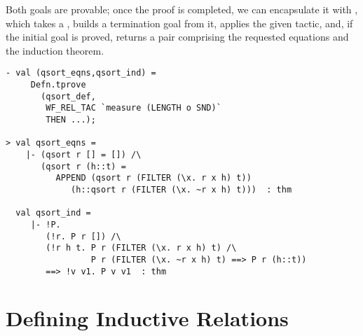 Both goals are provable; once the proof is completed, we can
encapsulate it with , which takes a , builds
a termination goal from it, applies the given tactic, and, if the
initial goal is proved, returns a pair comprising the requested
equations and the induction theorem.

\begin{session}
\begin{verbatim}
- val (qsort_eqns,qsort_ind) =
     Defn.tprove
       (qsort_def,
        WF_REL_TAC `measure (LENGTH o SND)`
        THEN ...);

> val qsort_eqns =
    |- (qsort r [] = []) /\
       (qsort r (h::t) =
          APPEND (qsort r (FILTER (\x. r x h) t))
             (h::qsort r (FILTER (\x. ~r x h) t)))  : thm

  val qsort_ind =
     |- !P.
        (!r. P r []) /\
        (!r h t. P r (FILTER (\x. r x h) t) /\
                 P r (FILTER (\x. ~r x h) t) ==> P r (h::t))
        ==> !v v1. P v v1  : thm
\end{verbatim}
\end{session}

\section{Defining Inductive Relations}

